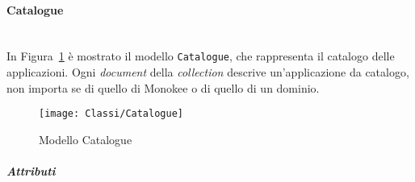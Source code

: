 \paragraph{Catalogue} \mbox{} \\
In Figura~\ref{fig:Catalogue} è mostrato il modello \texttt{Catalogue}, che rappresenta il catalogo delle applicazioni. Ogni \textit{document} della \textit{collection} descrive un'applicazione da catalogo, non importa se di quello di Monokee o di quello di un dominio.
\begin{figure}[h]
  \begin{center}
    \texttt{[image: Classi/Catalogue]}
  \caption[Modello Catalogue]{Modello Catalogue}
  \label{fig:Catalogue}
  \end{center} 
\end{figure}
\subparagraph{Attributi}
